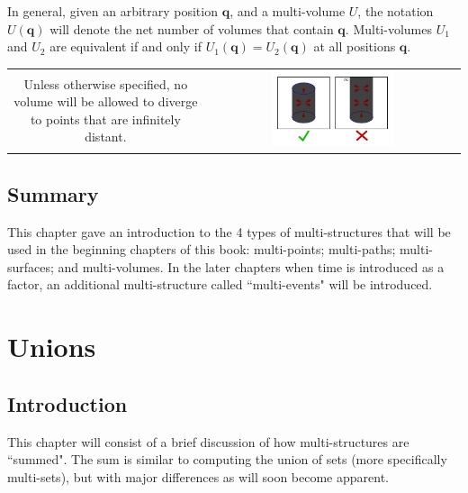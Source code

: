 \documentclass{book}
\begin{document}
In general, given an arbitrary position \(\mathbf{q}\), and a multi-volume \(U\), the notation \(U(\mathbf{q})\) will denote the net number of volumes that contain \(\mathbf{q}\). Multi-volumes \(U_1\) and \(U_2\) are equivalent if and only if \(U_1(\mathbf{q}) = U_2(\mathbf{q})\) at all positions \(\mathbf{q}\). 

\begin{center}
\begin{tabular}{cc}
\parbox{0.5\textwidth}{
Unless otherwise specified, no volume will be allowed to diverge to points that are infinitely distant.
} & \parbox{0.5\textwidth}{
\includegraphics[width = 0.5\textwidth]{Multi-structures/Multivolumes/no_infinite_volumes}
}
\end{tabular}
\end{center}



\section{Summary}

This chapter gave an introduction to the 4 types of multi-structures that will be used in the beginning chapters of this book: multi-points; multi-paths; multi-surfaces; and multi-volumes. In the later chapters when time is introduced as a factor, an additional multi-structure called ``multi-events" will be introduced.





\chapter{Unions}

\section{Introduction}

This chapter will consist of a brief discussion of how multi-structures are ``summed". The sum is similar to computing the union of sets (more specifically multi-sets), but with major differences as will soon become apparent.
\end{document}
